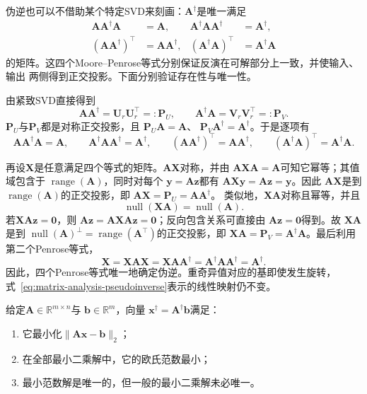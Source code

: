伪逆也可以不借助某个特定SVD来刻画：$\bm{A}^{\dagger}$是唯一满足
\begin{align*}
  \bm{A}\bm{A}^{\dagger}\bm{A}&=\bm{A},&
  \bm{A}^{\dagger}\bm{A}\bm{A}^{\dagger}&=\bm{A}^{\dagger},\\
  (\bm{A}\bm{A}^{\dagger})^{\top}
    &=\bm{A}\bm{A}^{\dagger},&
  (\bm{A}^{\dagger}\bm{A})^{\top}
    &=\bm{A}^{\dagger}\bm{A}
\end{align*}
的矩阵。这四个Moore--Penrose等式分别保证反演在可解部分上一致，并使输入、输出
两侧得到正交投影。下面分别验证存在性与唯一性。

由紧致SVD直接得到
\[
  \bm{A}\bm{A}^{\dagger}
  =\bm{U}_r\bm{U}_r^{\top}=:\bm{P}_{U},
  \qquad
  \bm{A}^{\dagger}\bm{A}
  =\bm{V}_r\bm{V}_r^{\top}=:\bm{P}_{V}.
\]
$\bm{P}_{U}$与$\bm{P}_{V}$都是对称正交投影，且
$\bm{P}_{U}\bm{A}=\bm{A}$、
$\bm{P}_{V}\bm{A}^{\dagger}=\bm{A}^{\dagger}$。于是逐项有
\[
  \bm{A}\bm{A}^{\dagger}\bm{A}=\bm{A},
  \qquad
  \bm{A}^{\dagger}\bm{A}\bm{A}^{\dagger}=\bm{A}^{\dagger},
  \qquad
  (\bm{A}\bm{A}^{\dagger})^{\top}=\bm{A}\bm{A}^{\dagger},
  \qquad
  (\bm{A}^{\dagger}\bm{A})^{\top}=\bm{A}^{\dagger}\bm{A}.
\]

再设$\bm{X}$是任意满足四个等式的矩阵。$\bm{A}\bm{X}$对称，并由
$\bm{A}\bm{X}\bm{A}=\bm{A}$可知它幂等；其值域包含于
$\operatorname{range}(\bm{A})$，同时对每个
$\bm{y}=\bm{A}\bm{z}$都有
$\bm{A}\bm{X}\bm{y}=\bm{A}\bm{z}=\bm{y}$。因此
$\bm{A}\bm{X}$是到$\operatorname{range}(\bm{A})$的正交投影，即
$\bm{A}\bm{X}=\bm{P}_{U}=\bm{A}\bm{A}^{\dagger}$。
类似地，$\bm{X}\bm{A}$对称且幂等，并且
\[
  \operatorname{null}(\bm{X}\bm{A})
  =\operatorname{null}(\bm{A}).
\]
若$\bm{X}\bm{A}\bm{z}=\bm{0}$，则
$\bm{A}\bm{z}=\bm{A}\bm{X}\bm{A}\bm{z}=\bm{0}$；反向包含关系可直接由
$\bm{A}\bm{z}=\bm{0}$得到。故
$\bm{X}\bm{A}$是到
$\operatorname{null}(\bm{A})^{\perp}
=\operatorname{range}(\bm{A}^{\top})$的正交投影，即
$\bm{X}\bm{A}=\bm{P}_{V}=\bm{A}^{\dagger}\bm{A}$。最后利用第二个Penrose等式，
\[
  \bm{X}
  =\bm{X}\bm{A}\bm{X}
  =\bm{X}\bm{A}\bm{A}^{\dagger}
  =\bm{A}^{\dagger}\bm{A}\bm{A}^{\dagger}
  =\bm{A}^{\dagger}.
\]
因此，四个Penrose等式唯一地确定伪逆。重奇异值对应的基即使发生旋转，
式~\eqref{eq:matrix-analysis-pseudoinverse}表示的线性映射仍不变。

\begin{theorem}[最小二乘与最小范数]
\label{thm:matrix-analysis-pseudoinverse-minimum-norm}
给定$\bm{A}\in\mathbb{R}^{m\times n}$与
$\bm{b}\in\mathbb{R}^m$，向量
$\bm{x}^{\dagger}=\bm{A}^{\dagger}\bm{b}$满足：
\begin{enumerate}
  \item 它最小化$\lVert\bm{A}\bm{x}-\bm{b}\rVert_2$；
  \item 在全部最小二乘解中，它的欧氏范数最小；
  \item 最小范数解是唯一的，但一般的最小二乘解未必唯一。
\end{enumerate}
\end{theorem}

